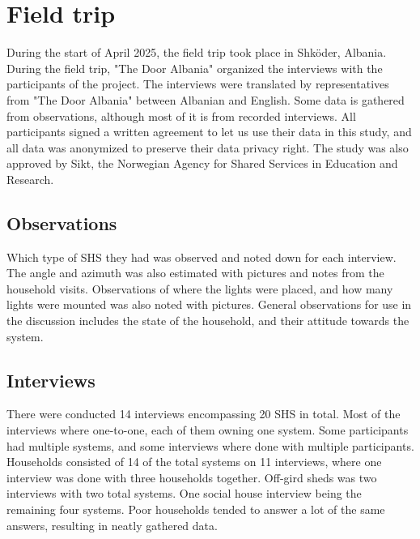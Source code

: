 \section{Field trip}
During the start of April 2025, the field trip took place in Shköder, Albania. During the field trip, "The Door Albania" organized the interviews with the participants of the project. The interviews were translated by representatives from "The Door Albania" between Albanian and English. Some data is gathered from observations, although most of it is from recorded interviews. All participants signed a written agreement to let us use their data in this study, and all data was anonymized to preserve their data privacy right. The study was also approved by Sikt, the Norwegian Agency for Shared Services in Education and Research.

\subsection{Observations}
Which type of SHS they had was observed and noted down for each interview. The angle and azimuth was also estimated with pictures and notes from the household visits. Observations of where the lights were placed, and how many lights were mounted was also noted with pictures. General observations for use in the discussion includes the state of the household, and their attitude towards the system. 

\subsection{Interviews}
There were conducted 14 interviews encompassing 20 SHS in total. Most of the interviews where one-to-one, each of them owning one system. Some participants had multiple systems, and some interviews where done with multiple participants. Households consisted of 14 of the total systems on 11 interviews, where one interview was done with three households together. Off-gird sheds was two interviews with two total systems. One social house interview being the remaining four systems. Poor households tended to answer a lot of the same answers, resulting in neatly gathered data.
